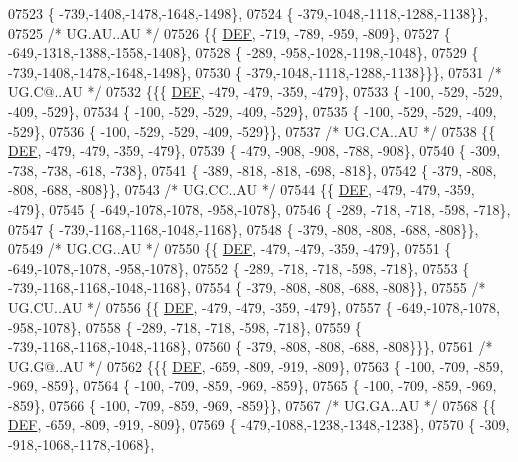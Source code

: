 \begin{DoxyCode}
07523 \{ -739,-1408,-1478,-1648,-1498\},
07524 \{ -379,-1048,-1118,-1288,-1138\}\},
07525 \textcolor{comment}{/* UG.AU..AU */}
07526 \{\{  \mbox{\hyperlink{1_88_84__epars_8h_a397419fc12b37ed479c8abb9d444d843}{DEF}}, -719, -789, -959, -809\},
07527 \{ -649,-1318,-1388,-1558,-1408\},
07528 \{ -289, -958,-1028,-1198,-1048\},
07529 \{ -739,-1408,-1478,-1648,-1498\},
07530 \{ -379,-1048,-1118,-1288,-1138\}\}\},
07531 \textcolor{comment}{/* UG.C@..AU */}
07532 \{\{\{  \mbox{\hyperlink{1_88_84__epars_8h_a397419fc12b37ed479c8abb9d444d843}{DEF}}, -479, -479, -359, -479\},
07533 \{ -100, -529, -529, -409, -529\},
07534 \{ -100, -529, -529, -409, -529\},
07535 \{ -100, -529, -529, -409, -529\},
07536 \{ -100, -529, -529, -409, -529\}\},
07537 \textcolor{comment}{/* UG.CA..AU */}
07538 \{\{  \mbox{\hyperlink{1_88_84__epars_8h_a397419fc12b37ed479c8abb9d444d843}{DEF}}, -479, -479, -359, -479\},
07539 \{ -479, -908, -908, -788, -908\},
07540 \{ -309, -738, -738, -618, -738\},
07541 \{ -389, -818, -818, -698, -818\},
07542 \{ -379, -808, -808, -688, -808\}\},
07543 \textcolor{comment}{/* UG.CC..AU */}
07544 \{\{  \mbox{\hyperlink{1_88_84__epars_8h_a397419fc12b37ed479c8abb9d444d843}{DEF}}, -479, -479, -359, -479\},
07545 \{ -649,-1078,-1078, -958,-1078\},
07546 \{ -289, -718, -718, -598, -718\},
07547 \{ -739,-1168,-1168,-1048,-1168\},
07548 \{ -379, -808, -808, -688, -808\}\},
07549 \textcolor{comment}{/* UG.CG..AU */}
07550 \{\{  \mbox{\hyperlink{1_88_84__epars_8h_a397419fc12b37ed479c8abb9d444d843}{DEF}}, -479, -479, -359, -479\},
07551 \{ -649,-1078,-1078, -958,-1078\},
07552 \{ -289, -718, -718, -598, -718\},
07553 \{ -739,-1168,-1168,-1048,-1168\},
07554 \{ -379, -808, -808, -688, -808\}\},
07555 \textcolor{comment}{/* UG.CU..AU */}
07556 \{\{  \mbox{\hyperlink{1_88_84__epars_8h_a397419fc12b37ed479c8abb9d444d843}{DEF}}, -479, -479, -359, -479\},
07557 \{ -649,-1078,-1078, -958,-1078\},
07558 \{ -289, -718, -718, -598, -718\},
07559 \{ -739,-1168,-1168,-1048,-1168\},
07560 \{ -379, -808, -808, -688, -808\}\}\},
07561 \textcolor{comment}{/* UG.G@..AU */}
07562 \{\{\{  \mbox{\hyperlink{1_88_84__epars_8h_a397419fc12b37ed479c8abb9d444d843}{DEF}}, -659, -809, -919, -809\},
07563 \{ -100, -709, -859, -969, -859\},
07564 \{ -100, -709, -859, -969, -859\},
07565 \{ -100, -709, -859, -969, -859\},
07566 \{ -100, -709, -859, -969, -859\}\},
07567 \textcolor{comment}{/* UG.GA..AU */}
07568 \{\{  \mbox{\hyperlink{1_88_84__epars_8h_a397419fc12b37ed479c8abb9d444d843}{DEF}}, -659, -809, -919, -809\},
07569 \{ -479,-1088,-1238,-1348,-1238\},
07570 \{ -309, -918,-1068,-1178,-1068\},

\end{DoxyCode}
